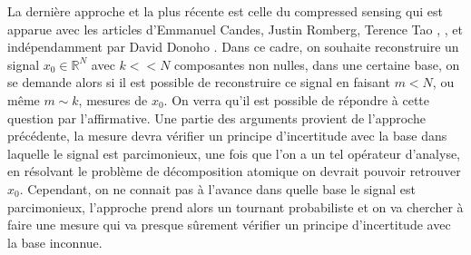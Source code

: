 La dernière approche et la plus récente est celle du compressed sensing qui est apparue avec les articles d'Emmanuel Candes, Justin Romberg, Terence Tao \cite{CT}, \cite{CR}, \cite{CRT} et indépendamment par David Donoho \cite{DonohoCS}. 
Dans ce cadre, on souhaite reconstruire un signal $x_0 \in \mathbb{R}^N$ avec $k << N$ composantes non nulles, dans une certaine base, on se demande alors si il est possible de reconstruire ce signal en faisant $m<N$, ou même $m\sim k$, mesures de $x_0$.
On verra qu'il est possible de répondre à cette question par l'affirmative.
Une partie des arguments provient de l'approche précédente, la mesure devra vérifier un principe d'incertitude avec la base dans laquelle le signal est parcimonieux, une fois que l'on a un tel opérateur d'analyse, en résolvant le problème de décomposition atomique on devrait pouvoir retrouver $x_0$.
Cependant, on ne connait pas à l'avance dans quelle base le signal est parcimonieux, l'approche prend alors un tournant probabiliste et on va chercher à faire une mesure qui va presque sûrement vérifier un principe d'incertitude avec la base inconnue.
